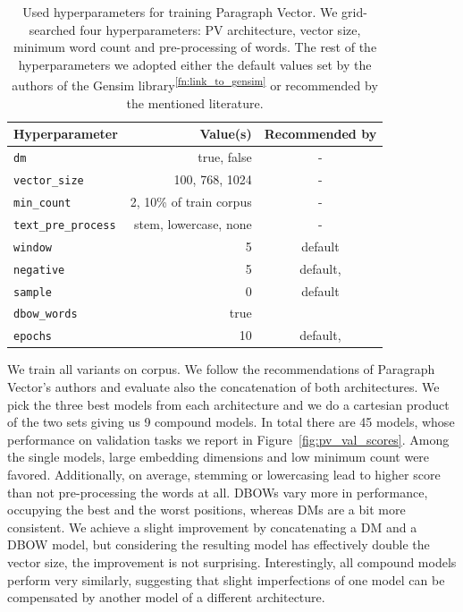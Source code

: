 \begin{table}
  \footnotesize
  \centering
  \begin{tabular}{lrc}
    \toprule
    Hyperparameter & Value(s) & Recommended by \\
    \midrule
    \texttt{dm} & true, false & - \\
    \texttt{vector\_size} & 100, 768, 1024 & - \\
    \texttt{min\_count} & 2, 10\% of train corpus & - \\
    \texttt{text\_pre\_process} & stem, lowercase, none & - \\
    \texttt{window} & 5 & default \\
    \texttt{negative} & 5 & default, \cite{lau2016empirical} \\
    \texttt{sample} & 0 & default \\
    \texttt{dbow\_words} & true & \cite{lau2016empirical} \\
    \texttt{epochs} & 10 & default, \cite{dai2015document} \\
    \bottomrule
  \end{tabular}

  \caption{Used hyperparameters for training Paragraph Vector. We grid-searched
  four hyperparameters: PV architecture, vector size, minimum word count and
  pre-processing of words. The rest of the hyperparameters we adopted either the
  default values set by the authors of the Gensim
  library\textsuperscript{\ref{fn:link_to_gensim}} or recommended by the
  mentioned literature.}

  \label{table:pv_hyperparams}

\end{table}

We train all variants on  corpus. We follow the
recommendations of Paragraph Vector's authors and evaluate also the
concatenation of both architectures. We pick the three best models from each
architecture and we do a cartesian product of the two sets giving us 9 compound
models. In total there are 45 models, whose performance on validation tasks we
report in Figure~\ref{fig:pv_val_scores}. Among the single models, large
embedding dimensions and low minimum count were favored. Additionally, on
average, stemming or lowercasing lead to higher score than not pre-processing
the words at all. DBOWs vary more in performance, occupying the best and the
worst positions, whereas DMs are a bit more consistent. We achieve a slight
improvement by concatenating a DM and a DBOW model, but considering the
resulting model has effectively double the vector size, the improvement is not
surprising. Interestingly, all compound models perform very similarly,
suggesting that slight imperfections of one model can be compensated by another
model of a different architecture.

